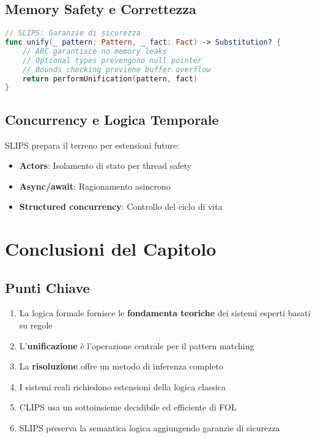 \subsection{Memory Safety e Correttezza}

\begin{lstlisting}[language=Swift]
// SLIPS: Garanzie di sicurezza
func unify(_ pattern: Pattern, _ fact: Fact) -> Substitution? {
    // ARC garantisce no memory leaks
    // Optional types prevengono null pointer
    // Bounds checking previene buffer overflow
    return performUnification(pattern, fact)
}
\end{lstlisting}

\subsection{Concurrency e Logica Temporale}

SLIPS prepara il terreno per estensioni future:

\begin{itemize}
\item \textbf{Actors}: Isolamento di stato per thread safety
\item \textbf{Async/await}: Ragionamento asincrono
\item \textbf{Structured concurrency}: Controllo del ciclo di vita
\end{itemize}

\section{Conclusioni del Capitolo}

\subsection{Punti Chiave}

\begin{enumerate}
\item La logica formale fornisce le \textbf{fondamenta teoriche} dei sistemi esperti basati su regole
\item L'\textbf{unificazione} è l'operazione centrale per il pattern matching
\item La \textbf{risoluzione} offre un metodo di inferenza completo
\item I sistemi reali richiedono estensioni della logica classica
\item CLIPS usa un sottoinsieme decidibile ed efficiente di FOL
\item SLIPS preserva la semantica logica aggiungendo garanzie di sicurezza
\end{enumerate}

